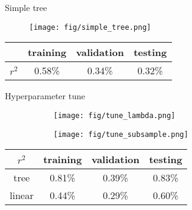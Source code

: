 \documentclass[9pt]{beamer}
\begin{document}
\begin{frame}{Simple tree}


\begin{figure}
    \centering
    \texttt{[image: fig/simple\_tree.png]}
\end{figure}

\begin{table}[h!]
\centering
\begin{tabular}{c|c|c|c}
\hline
 & \textbf{training} & \textbf{validation} & \textbf{testing} \\ \hline
$r^2$      & 0.58\%      & 0.34\%      & 0.32\%      \\ \hline
\end{tabular}
\end{table}



\end{frame}



\begin{frame}{Hyperparameter tune}


\begin{figure}[h!]
    \centering
    \begin{subfigure}[b]{0.475\textwidth}
        \centering
        \texttt{[image: fig/tune\_lambda.png]}
        \label{fig:figure1}
    \end{subfigure}
    \begin{subfigure}[b]{0.475\textwidth}
        \centering
        \texttt{[image: fig/tune\_subsample.png]}
        \label{fig:figure2}
    \end{subfigure}
    \label{fig:three_figures}
\end{figure}



\begin{table}[h!]
\centering
\begin{tabular}{c|c|c|c}
\hline
$r^2$ & \textbf{training} & \textbf{validation} & \textbf{testing} \\ \hline
tree      & 0.81\%      & 0.39\%      & 0.83\%      \\ \hline
linear     & 0.44\%      & 0.29\%      & 0.60\%      \\ \hline
\end{tabular}
\end{table}



\end{frame}
\end{document}
